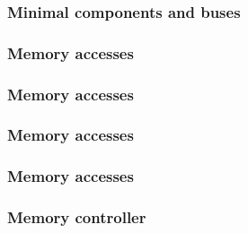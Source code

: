 \begin{frame}
  \frametitle{Minimal components and buses}

  \begin{center}
  \end{center}

\end{frame}


\begin{frame}
  \frametitle{Memory accesses}

  \begin{center}
  \end{center}

\end{frame}


\begin{frame}
  \frametitle{Memory accesses}

  \begin{center}
  \end{center}

\end{frame}


\begin{frame}
  \frametitle{Memory accesses}

  \begin{center}
  \end{center}

\end{frame}


\begin{frame}
  \frametitle{Memory accesses}

  \begin{center}
  \end{center}

\end{frame}


\begin{frame}
  \frametitle{Memory controller}

  \begin{center}
  \end{center}

\end{frame}

